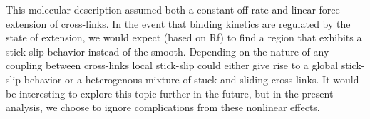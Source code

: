 This molecular description assumed both a constant off-rate and linear force extension of cross-links.  In the event that binding kinetics are regulated by the state of extension, we would expect (based on Rf) to find a region that exhibits a stick-slip behavior instead of the smooth.  Depending on the nature of any coupling between cross-links local stick-slip could either give rise to a global stick-slip behavior or a heterogenous mixture of stuck and sliding cross-links.  It would be interesting to explore this topic further in the future, but in the present analysis, we choose to ignore complications from these nonlinear effects.


